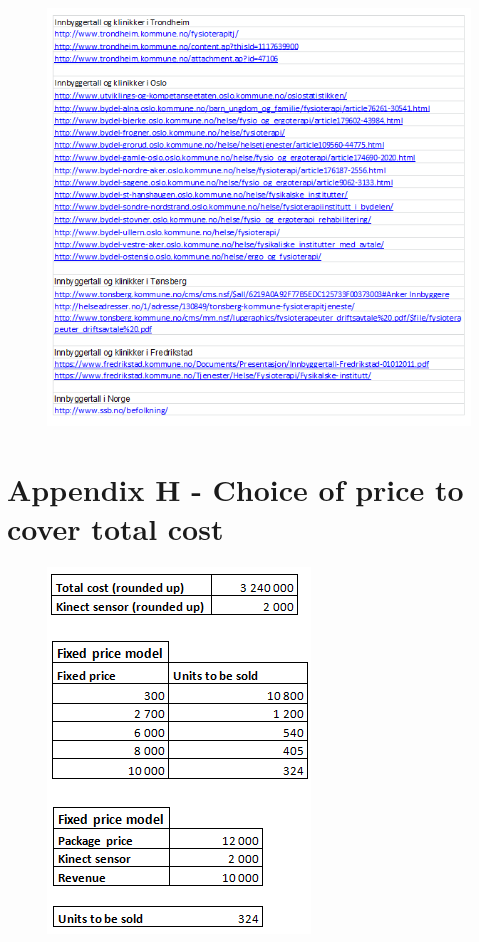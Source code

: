 \begin{figure}
\begin{center}
\includegraphics[scale=0.8]{kilder}
\label{fig:sources}
\end{center}
\end{figure}

\newpage
\section*{Appendix H - Choice of price to cover total cost}
\label{H}

\begin{figure}[h!]
\begin{center}
\includegraphics[scale=0.8]{fixedall}
\label{fig:fixedAll}
\end{center}
\end{figure}

